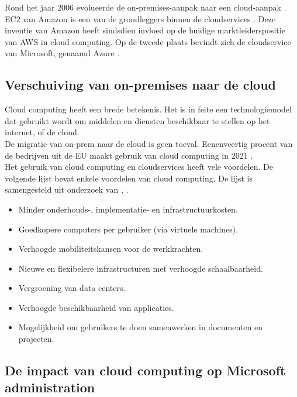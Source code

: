 Rond het jaar 2006 evolueerde de on-premises-aanpak naar een cloud-aanpak \autocite{Hayes2008}. \ac{EC2} van Amazon is een van de grondleggers binnen de cloudservices \autocite{Qian2009}. Deze inventie van Amazon heeft sindsdien invloed op de huidige marktleiderspositie van AWS in cloud computing. Op de tweede plaats bevindt zich de cloudservice van Microsoft, genaamd Azure \autocite{Vailshery2022}.



\subsection{Verschuiving van on-premises naar de cloud}


Cloud computing heeft een brede betekenis. Het is in feite een technologiemodel dat gebruikt wordt om middelen en diensten beschikbaar te stellen op het internet, of de cloud. \autocite{Haag2009} \\

De migratie van \ac{on-prem} naar de cloud is geen toeval. Eenenveertig procent van de bedrijven uit de \ac{EU} maakt gebruik van cloud computing in 2021 \autocite{EU2021}. \\

Het gebruik van cloud computing en cloudservices heeft vele voordelen. De volgende lijst bevat enkele voordelen van cloud computing. De lijst is samengesteld uit onderzoek van \textcite{Aljabre2012}, \textcite{Rittinghouse2016}.

\begin{itemize}
    \item Minder onderhouds-, implementatie- en infrastructuurkosten.
    \item Goedkopere computers per gebruiker (via virtuele machines).
    \item Verhoogde mobiliteitskansen voor de werkkrachten.
    \item Nieuwe en flexibelere infrastructuren met verhoogde schaalbaarheid.
    \item Vergroening van data centers.
    \item Verhoogde beschikbaarheid van applicaties.
    \item Mogelijkheid om gebruikers te doen samenwerken in documenten en projecten.
\end{itemize}

\subsection{De impact van cloud computing op Microsoft administration}


